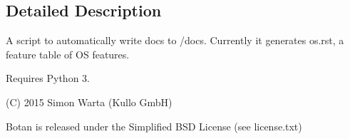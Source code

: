 \subsection{Detailed Description}
\begin{DoxyVerb}A script to automatically write docs to /docs. Currently it generates
os.rst, a feature table of OS features.

Requires Python 3.

(C) 2015 Simon Warta (Kullo GmbH)

Botan is released under the Simplified BSD License (see license.txt)
\end{DoxyVerb}
 